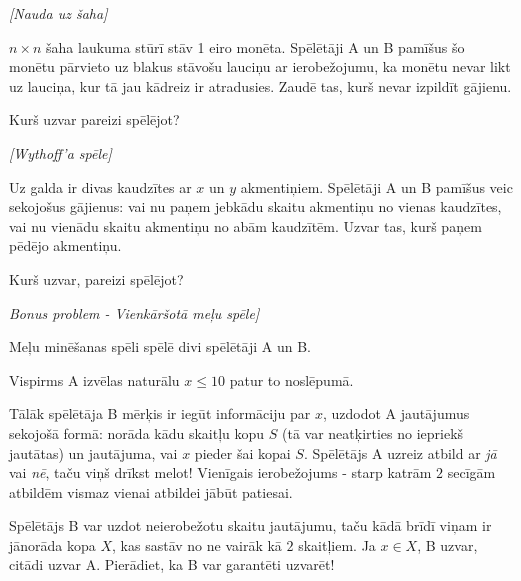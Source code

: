 \begin{problem}
\textit{[Nauda uz šaha]}

$n \times n$ šaha laukuma stūrī stāv 1 eiro monēta. Spēlētāji A un B pamīšus šo monētu pārvieto uz blakus stāvošu lauciņu ar ierobežojumu, ka monētu nevar likt uz lauciņa, kur tā jau kādreiz ir atradusies. Zaudē tas, kurš nevar izpildīt gājienu. 

Kurš uzvar pareizi spēlējot?

\end{problem}

\begin{problem}
\textit{[Wythoff'a spēle]}

Uz galda ir divas kaudzītes ar $x$ un $y$ akmentiņiem. Spēlētāji A un B pamīšus veic sekojošus gājienus: vai nu paņem jebkādu skaitu akmentiņu no vienas kaudzītes, vai nu vienādu skaitu akmentiņu no abām kaudzītēm. Uzvar tas, kurš paņem pēdējo akmentiņu. 

Kurš uzvar, pareizi spēlējot?

\end{problem}

\begin{problem}
\textit{Bonus problem - Vienkāršotā meļu spēle]}

Meļu minēšanas spēli spēlē divi spēlētāji A un B. 

Vispirms A izvēlas naturālu $ x \le 10$ patur to noslēpumā. 

Tālāk spēlētāja B mērķis ir iegūt informāciju par $x$, uzdodot A jautājumus sekojošā formā: norāda kādu skaitļu kopu $S$ (tā var neatķirties no iepriekš jautātas) un jautājuma, vai $x$ pieder šai kopai $S$. Spēlētājs A uzreiz atbild ar \textit{jā} vai \textit{nē}, taču viņš drīkst melot! Vienīgais ierobežojums - starp katrām $2$ secīgām atbildēm vismaz vienai atbildei jābūt patiesai.

Spēlētājs B var uzdot neierobežotu skaitu jautājumu, taču kādā brīdī viņam ir jānorāda kopa $X$, kas sastāv no ne vairāk kā $2$ skaitļiem. Ja  $x \in X$, B uzvar, citādi uzvar A. Pierādiet, ka B var garantēti uzvarēt!

\end{problem}


